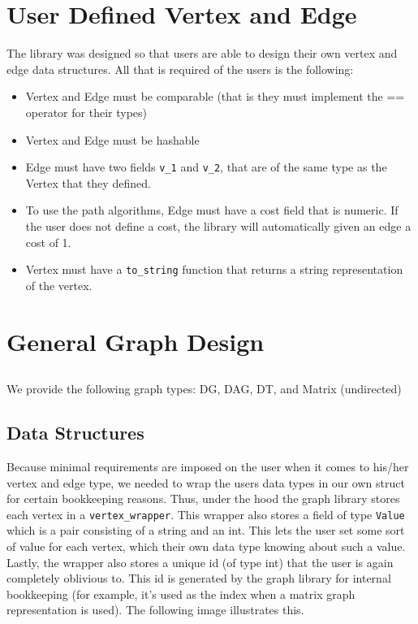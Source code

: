 \documentclass{article}
\begin{document}
\section{User Defined Vertex and Edge}
The library was designed so that users are able to design their own vertex and edge data structures. All that is required of the users is the following:
\begin{itemize}
\item Vertex and Edge must be comparable (that is they must implement the == operator for their types)
\item Vertex and Edge must be hashable
\item Edge must have two fields \texttt{v\_1} and \texttt{v\_2}, that are of the same type as the Vertex that they defined.
\item To use the path algorithms, Edge must have a cost field that is numeric. If the user does not define a cost, the library will automatically given an edge a cost of 1.
\item Vertex must have a \texttt{to\_string} function that returns a string representation of the vertex. 
\end{itemize}

\section{General Graph Design}
\subsection{}
We provide the following graph types: DG, DAG, DT, and Matrix (undirected)

\subsection{Data Structures}
Because minimal requirements are imposed on the user when it comes to his/her vertex and edge type, we needed to wrap the users data types in our own struct for certain bookkeeping reasons. Thus, under the hood the graph library stores each vertex in a \texttt{vertex\_wrapper}. This wrapper also stores a field of type \texttt{Value} which is a pair consisting of a string and an int. This lets the user set some sort of value for each vertex, which their own data type knowing about such a value. Lastly, the wrapper also stores a unique id (of type int) that the user is again completely oblivious to. This id is generated by the graph library for internal bookkeeping (for example, it's used as the index when a matrix graph representation is used). The following image illustrates this.
\end{document}
